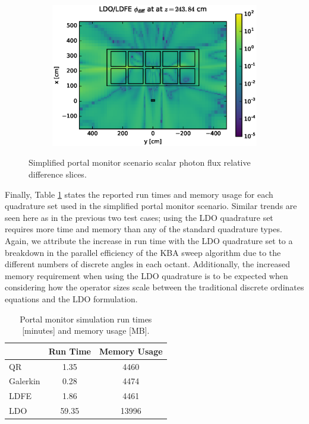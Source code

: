 \documentclass{article} %
\begin{document}
\begin{figure}[!htb]
\ContinuedFloat
\begin{subfigure}{\textwidth}
\centering
\includegraphics[max height=0.445\textheight]
{portal-flux-diff-ldfe.eps}
\end{subfigure}
\caption{Simplified portal monitor scenario scalar photon flux relative
         difference slices.}
\label{cargo-fwd-diff-rel}
\end{figure}

Finally, Table \ref{cargo-stats} states the reported run times and memory
usage for each quadrature set used in the simplified portal monitor scenario.
Similar trends are seen here as in the previous two test cases; using the LDO
quadrature set requires more time and memory than any of the standard
quadrature types. Again, we attribute the increase in run time with the LDO
quadrature set to a breakdown in the parallel efficiency of the KBA sweep
algorithm due to the different numbers of discrete angles in each octant.
Additionally, the increased memory requirement when using the LDO quadrature
is to be expected when considering how the operator sizes scale between the
traditional discrete ordinates equations and the LDO formulation.

\begin{table}[!htb]
\centering
\caption{Portal monitor simulation run times [minutes] and memory usage [MB].}
\label{cargo-stats}
\begin{tabular}{l|cc}
              & Run Time       & Memory Usage       \\ \hline
QR            & 1.35 & 4460         \\
Galerkin      & 0.28 & 4474         \\
LDFE          & 1.86 & 4461         \\
LDO           & 59.35 & 13996
\end{tabular}
\end{table}
\end{document}
